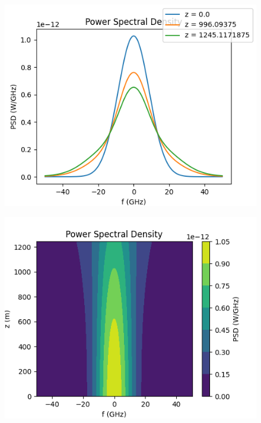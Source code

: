 \documentclass[10pt, a4paper, twocolumn]{article} %
\begin{document}
\begin{figure}
    \includegraphics[width=\linewidth]{plots/compFreqPFL.png}
    \caption{}
    \label{compFreqPFL}
\end{figure}

\begin{figure}
    \includegraphics[width=\linewidth]{plots/compFreqPFL2D.png}
    \caption{}
    \label{compFreqPFL2D}
\end{figure} 
\end{document}

